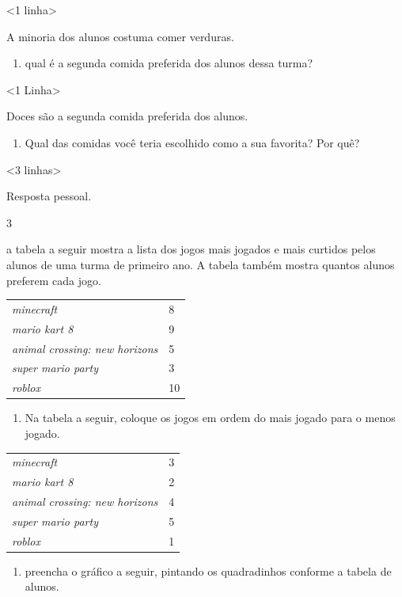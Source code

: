 \textless{}1 linha\textgreater{}

A minoria dos alunos costuma comer verduras.

\begin{enumerate}
\def\labelenumi{\Alph{enumi})}
\item
  qual é a segunda comida preferida dos alunos dessa turma?
\end{enumerate}

\textless{}1 Linha\textgreater{}

Doces são a segunda comida preferida dos alunos.

\begin{enumerate}
\def\labelenumi{\Alph{enumi})}
\item
  Qual das comidas você teria escolhido como a sua favorita? Por quê?
\end{enumerate}

\textless{}3 linhas\textgreater{}

Resposta pessoal.

\num{3}

a tabela a seguir mostra a lista dos jogos mais jogados e mais curtidos pelos
alunos de uma turma de primeiro ano. A tabela também mostra quantos alunos preferem cada
jogo.

\begin{longtable}[]{@{}ll@{}}
\toprule
\emph{minecraft} & 8\tabularnewline
\emph{mario kart 8} & 9\tabularnewline
\emph{animal crossing: new horizons} & 5\tabularnewline
\emph{super mario party} & 3\tabularnewline
\emph{roblox} & 10\tabularnewline
\bottomrule
\end{longtable}

\begin{enumerate}
\def\labelenumi{\Alph{enumi})}
\item
  Na tabela a seguir, coloque os jogos em ordem do
  mais jogado para o menos jogado.
\end{enumerate}

\begin{longtable}[]{@{}ll@{}}
\toprule
\emph{minecraft} & 3\tabularnewline
\emph{mario kart 8} & 2\tabularnewline
\emph{animal crossing: new horizons} & 4\tabularnewline
\emph{super mario party} & 5\tabularnewline
\emph{roblox} & 1\tabularnewline
\bottomrule
\end{longtable}


\begin{enumerate}
\def\labelenumi{\Alph{enumi})}
\item
  preencha o gráfico a seguir, pintando os quadradinhos conforme a tabela
  de alunos.
\end{enumerate}

